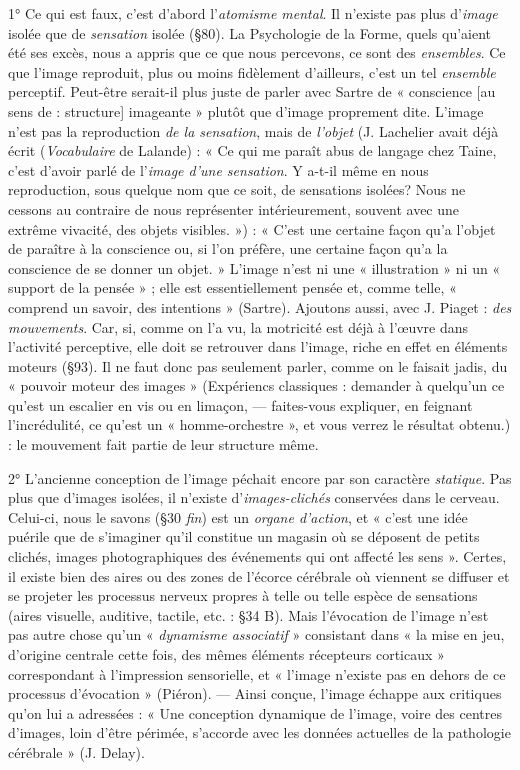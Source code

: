 1° Ce qui est faux, c’est d’abord l’{\it atomisme mental}. Il n’existe
pas plus d’{\it image} isolée que de {\it sensation} isolée (\S80). La Psychologie
de la Forme, quels qu’aient été ses excès, nous a appris que ce que
nous percevons, ce sont des {\it ensembles}. Ce que l’image reproduit, plus
ou moins fidèlement d’ailleurs, c’est un tel {\it ensemble} perceptif. Peut-être
serait-il plus juste de parler avec Sartre de « conscience [au
sens de : structure] imageante » plutôt que d’image proprement dite.
L'image n’est pas la reproduction {\it de la sensation}, mais de {\it l’objet}
{\scriptsize (J. Lachelier avait déjà écrit ({\it Vocabulaire} de Lalande) : « Ce qui me paraît abus
de langage chez Taine, c’est d’avoir parlé de l’{\it image d'une sensation}. Y a-t-il même en
nous reproduction, sous quelque nom que ce soit, de sensations isolées? Nous ne
cessons au contraire de nous représenter intérieurement, souvent avec une extrême
vivacité, des objets visibles. »)}
 :
« C’est une certaine façon qu’a l’objet de paraître à la conscience ou,
si l’on préfère, une certaine façon qu’a la conscience de se donner un
objet. » L'image n’est ni une « illustration » ni un « support de la
pensée » ; elle est essentiellement pensée et, comme telle, « comprend
un savoir, des intentions » (Sartre). Ajoutons aussi, avec J. Piaget :
{\it des mouvements}. Car, si, comme on l’a vu, la motricité est déjà à
l’œuvre dans l’activité perceptive, elle doit se retrouver dans l’image,
riche en effet en éléments moteurs (\S 93). Il ne faut donc pas seulement
parler, comme on le faisait jadis, du « pouvoir moteur des
images »
{\scriptsize (Expériencs classiques : demander à quelqu’un ce qu’est un escalier en vis ou
en limaçon, — faites-vous expliquer, en feignant l’incrédulité, ce qu'est un
« homme-orchestre », et vous verrez le résultat obtenu.)}
 : le mouvement fait partie de leur structure même.

2° L’ancienne conception de l’image péchait encore par son caractère
{\it statique}. Pas plus que d’images isolées, il n’existe d’{\it images-clichés}
conservées dans le cerveau. Celui-ci, nous le savons (\S 30 {\it fin})
est un {\it organe d’action}, et « c’est une idée puérile que de s’imaginer
qu’il constitue un magasin où se déposent de petits clichés, images
photographiques des événements qui ont affecté les sens ». Certes,
il existe bien des aires ou des zones de l’écorce cérébrale où viennent
se diffuser et se projeter les processus nerveux propres à telle ou telle
espèce de sensations (aires visuelle, auditive, tactile, etc. : \S 34 B).
Mais l'évocation de l’image n’est pas autre chose qu’un « {\it dynamisme
associatif} » consistant dans « la mise en jeu, d’origine centrale cette
fois, des mêmes éléments récepteurs corticaux » correspondant à
l'impression sensorielle, et « l’image n’existe pas en dehors de ce processus
d’évocation » (Piéron). — Ainsi conçue, l’image échappe aux
critiques qu’on lui a adressées : « Une conception dynamique de
l’image, voire des centres d’images, loin d’être périmée, s'accorde
avec les données actuelles de la pathologie cérébrale » (J. Delay).

